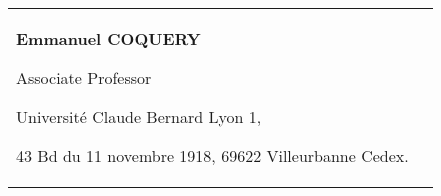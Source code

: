 
\begin{tabularx}{\textwidth}{@{}X X@{}}
\textbf{Emmanuel COQUERY}\par
Associate Professor\par
Université Claude Bernard Lyon 1,\par 
43 Bd du 11 novembre 1918, 69622 Villeurbanne Cedex.\par 
\makefield{\faEnvelope}{\url{emmanuel.coquery@liris.cnrs.fr}}
\\
\end{tabularx}
